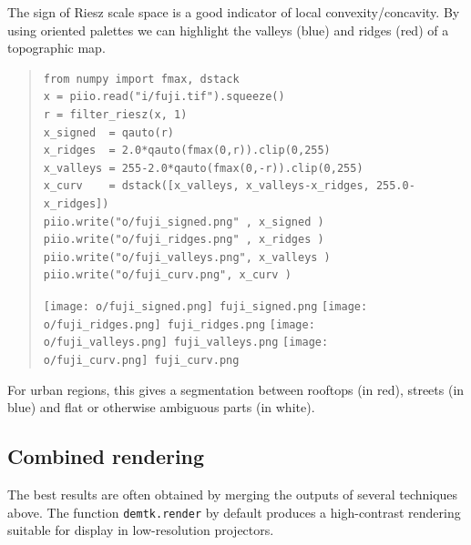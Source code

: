 The sign of Riesz scale space is a good indicator of local
convexity/concavity.  By using oriented palettes we can highlight the valleys
(blue)
and ridges (red) of a topographic map.  

\begin{quote}
\begin{verbatim}
from numpy import fmax, dstack
x = piio.read("i/fuji.tif").squeeze()
r = filter_riesz(x, 1)
x_signed  = qauto(r)
x_ridges  = 2.0*qauto(fmax(0,r)).clip(0,255)
x_valleys = 255-2.0*qauto(fmax(0,-r)).clip(0,255)
x_curv    = dstack([x_valleys, x_valleys-x_ridges, 255.0-x_ridges])
piio.write("o/fuji_signed.png" , x_signed )
piio.write("o/fuji_ridges.png" , x_ridges )
piio.write("o/fuji_valleys.png", x_valleys )
piio.write("o/fuji_curv.png", x_curv )
\end{verbatim}
\texttt{[image: o/fuji\_signed.png]}~\verb+fuji_signed.png+
\texttt{[image: o/fuji\_ridges.png]}~\verb+fuji_ridges.png+
\texttt{[image: o/fuji\_valleys.png]}~\verb+fuji_valleys.png+
\texttt{[image: o/fuji\_curv.png]}~\verb+fuji_curv.png+
\end{quote}

For urban regions, this gives a segmentation between rooftops (in red),
streets (in blue) and flat or otherwise ambiguous parts (in white).

%

\clearpage
\subsection{Combined rendering}

The best results are often obtained by merging the outputs of several
techniques above.  The function \verb+demtk.render+ by default produces a
high-contrast rendering suitable for display in low-resolution projectors.

